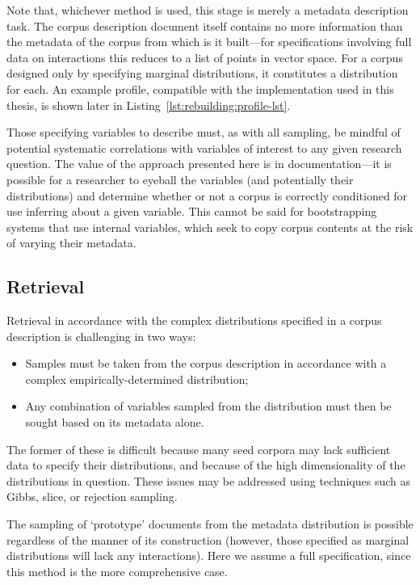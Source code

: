 Note that, whichever method is used, this stage is merely a metadata description task.  The corpus description document itself contains no more information than the metadata of the corpus from which is it built---for specifications involving full data on interactions this reduces to a list of points in vector space.  For a corpus designed only by specifying marginal distributions, it constitutes a distribution for each.  An example profile, compatible with the implementation used in this thesis, is shown later in Listing~\ref{lst:rebuilding:profile-lst}.

Those specifying variables to describe must, as with all sampling, be mindful of potential systematic correlations with variables of interest to any given research question.  The value of the approach presented here is in documentation---it is possible for a researcher to eyeball the variables (and potentially their distributions) and determine whether or not a corpus is correctly conditioned for use inferring about a given variable.  This cannot be said for bootstrapping systems that use internal variables, which seek to copy corpus contents at the risk of varying their metadata.


\subsection{Retrieval}
Retrieval in accordance with the complex distributions specified in a corpus description is challenging in two ways:

\begin{itemize}
    \item Samples must be taken from the corpus description in accordance with a complex empirically-determined distribution;
    \item Any combination of variables sampled from the distribution must then be sought based on its metadata alone.
\end{itemize}

The former of these is difficult because many seed corpora may lack sufficient data to specify their distributions, and because of the high dimensionality of the distributions in question.  These issues may be addressed using techniques such as Gibbs, slice, or rejection sampling\cite{gilks1992adaptive,neal2003}.

The sampling of `prototype' documents from the metadata distribution is possible regardless of the manner of its construction (however, those specified as marginal distributions will lack any interactions).  Here we assume a full specification, since this method is the more comprehensive case.

